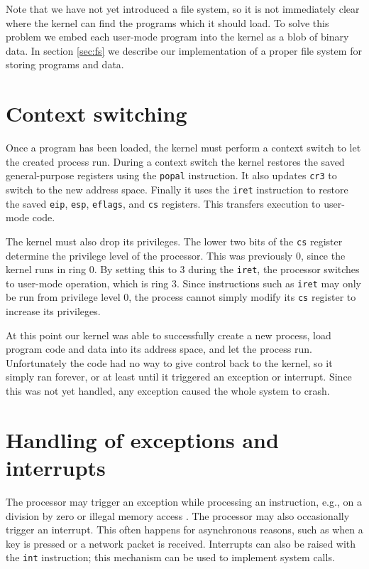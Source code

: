 \documentclass{report}
\begin{document}
Note that we have not yet introduced a file system, so it is not immediately
clear where the kernel can find the programs which it should load. To solve
this problem we embed each user-mode program into the kernel as a blob of
binary data. In section \ref{sec:fs} we describe our implementation of a
proper file system for storing programs and data.

\section{Context switching}
Once a program has been loaded, the kernel must perform a context switch to
let the created process run. During a context switch the kernel restores the
saved general-purpose registers using the \texttt{popal} instruction. It also
updates \texttt{cr3} to switch to the new address space. Finally it uses the
\texttt{iret} instruction to restore the saved \texttt{eip}, \texttt{esp},
\texttt{eflags}, and \texttt{cs} registers. This transfers execution to
user-mode code. 

The kernel must also drop its privileges. The lower two bits of the
\texttt{cs} register determine the privilege level of the processor. This was
previously 0, since the kernel runs in ring 0. By setting this to 3 during the
\texttt{iret}, the processor switches to user-mode operation, which is ring 3.
Since instructions such as \texttt{iret} may only be run from privilege level
0, the process cannot simply modify its \texttt{cs} register to increase its
privileges.

At this point our kernel was able to successfully create a new process, load
program code and data into its address space, and let the process run.
Unfortunately the code had no way to give control back to the kernel, so it
simply ran forever, or at least until it triggered an exception or interrupt.
Since this was not yet handled, any exception caused the whole system to
crash.


\section{Handling of exceptions and interrupts}
The processor may trigger an exception while processing an instruction, e.g.,
on a division by zero or illegal memory access \cite{manual8086ch9, exceptions}.
The processor may also occasionally trigger an interrupt. This often happens
for asynchronous reasons, such as when a key is pressed or a network packet is
received. Interrupts can also be raised with the \texttt{int} instruction;
this mechanism can be used to implement system calls.
\end{document}
